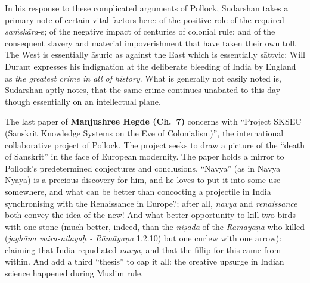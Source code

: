 In his response to these complicated arguments of Pollock, Sudarshan takes a primary note of certain vital factors here: of the positive role of the required {\sl saṁskāra}-s; of the negative impact of centuries of colonial rule; and of the consequent slavery and material impoverishment that have taken their own toll. The West is essentially āsuric as against the East which is essentially sāttvic: Will Durant expresses his indignation at the deliberate bleeding of India by England as {\sl the greatest crime in all of history}. What is generally not easily noted is, Sudarshan aptly notes, that the same crime continues unabated to this day though essentially on an intellectual plane.
\vskip 6pt

The last paper of {\bf Manjushree Hegde (Ch.~7)} concerns with “Project SKSEC (Sanskrit Knowledge Systems on the Eve of Colonialism)”, the international collaborative project of Pollock. The project seeks to draw a picture of the “death of Sanskrit” in the face of European modernity. The paper holds a mirror to Pollock's predetermined conjectures and conclusions. “Navya” (as in Navya Nyāya) is a precious discovery for him, and he loves to put it into some use somewhere, and what can be better than concocting a projectile in India synchronising with the Renaissance in Europe?; after all, {\sl navya} and {\sl renaissance} both convey the idea of the new! And what better opportunity to kill two birds with one stone (much better, indeed, than the {\sl niṣāda} of the {\sl Rāmāyaṇa} who killed ({\sl jaghāna vaira-nilayaḥ - Rāmāyaṇa} 1.2.10) but one curlew with one arrow): claiming that India repudiated {\sl navya}, and that the fillip for this came from within. And add a third “thesis” to cap it all: the creative upsurge in Indian science happened during Muslim rule.

